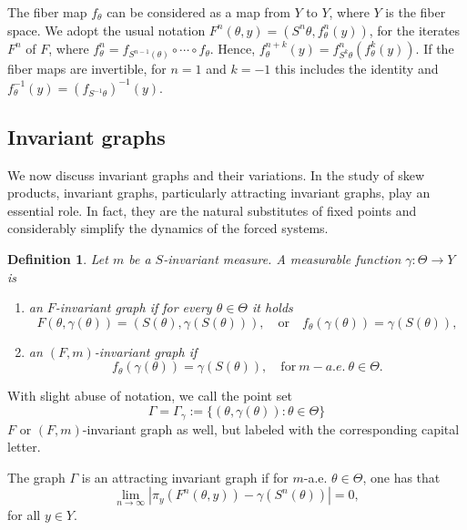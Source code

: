 \documentclass[11pt,reqno]{amsart}
\theoremstyle{plain}
\newtheorem{definition}[theorem]{Definition}
\newtheorem*{theorem A}{Theorem A}
\newtheorem*{theorem B}{Theorem B}
\newtheorem*{theorem C}{Theorem C}
\newtheorem*{theorem 1}{Theorem 1}
\newtheorem*{theorem 2}{Theorem 2}
\newtheorem*{theorem 3}{Theorem 3}
\numberwithin{equation}{section}
\begin{document}
   The fiber map $f_\theta$ can be considered as a map
from $Y$ to $ Y$, where $ Y$ is the fiber space.
We adopt the usual notation $ F^{n}(\theta,y ) = (S^{n}\theta , f_{\theta}^{n}(y))$,
for the iterates $F^{n}$ of $F$, where $f^{n}_{\theta} = f_{S^{n-1}(\theta)} \circ \cdots \circ f_{\theta}$.
Hence, $f_\theta^{n+k}(y) = f_{S^k \theta}^n (f^k_\theta(y))$. If the fiber maps are invertible, for $n = 1$ and $k =-1$ this includes the identity and $f_\theta^{-1}(y) = (f_{S^{-1}\theta})^{-1}(y)$.

\subsection{Invariant graphs}\label{assp}
We now discuss invariant graphs and their variations.
 In the study of skew products, invariant graphs, particularly attracting invariant graphs, play an essential role. In fact, they are the natural substitutes of fixed points and considerably simplify the dynamics of the forced systems.

\begin{definition}    
Let $m$ be a $S$-invariant measure. A measurable function $\gamma:\Theta \to Y$ is
\begin{enumerate}         
  \item[i)]
  an {\em{$F$-invariant graph}} if for every $\theta \in \Theta$ it holds
$$
F(\theta,\gamma(\theta))=(S(\theta),\gamma(S(\theta))), \quad \text{or} \quad f_\theta(\gamma(\theta))=\gamma(S(\theta)),
$$
  \item[ii)]
  an {\em{$(F,m)$-invariant graph}} if
\begin{equation}\label{1graph}
 f_\theta(\gamma(\theta))=\gamma(S(\theta)),  \quad \text{for} \ m-a.e. \ \theta\in \Theta.
\end{equation}
\end{enumerate}
\end{definition}

With slight abuse of notation, we call the point set
$$
\Gamma=\Gamma_\gamma :=\{(\theta,\gamma(\theta)):\theta \in \Theta\} 
$$
$F$ or $(F,m)$-invariant graph as well, but labeled with
the corresponding capital letter.

The graph $\Gamma$ is an attracting invariant graph if for $m$-a.e. $\theta \in \Theta$, one has that
\begin{equation*}
  \lim_{n \to \infty}|\pi_y(F^n(\theta,y))-\gamma(S^n(\theta))|=0,
\end{equation*}
for all $y \in Y$.
\end{document}
